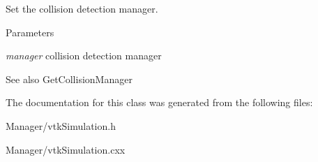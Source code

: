 Set the collision detection manager. 
\begin{DoxyParams}{Parameters}
\item[{\em manager}]collision detection manager \end{DoxyParams}
\begin{DoxySeeAlso}{See also}
GetCollisionManager 
\end{DoxySeeAlso}


The documentation for this class was generated from the following files:\begin{DoxyCompactItemize}
\item 
Manager/vtkSimulation.h\item 
Manager/vtkSimulation.cxx\end{DoxyCompactItemize}
